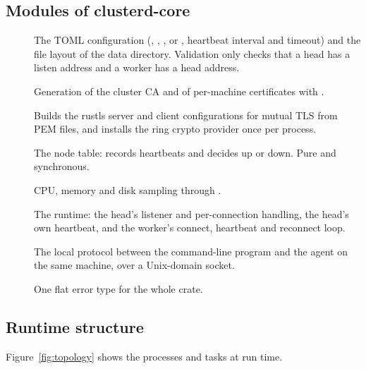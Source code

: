 \documentclass{article}
\begin{document}
\subsection{Modules of clusterd-core}

\begin{description}
  \item[] The TOML configuration (,
    , ,  or
    , heartbeat interval and timeout) and the file layout
    of the data directory. Validation only checks that a head has a
    listen address and a worker has a head address.
  \item[] Generation of the cluster CA and of per-machine
    certificates with .
  \item[] Builds the rustls server and client configurations
    for mutual TLS from PEM files, and installs the ring crypto provider
    once per process.
  \item[] The node table: records heartbeats and decides up or
    down. Pure and synchronous.
  \item[] CPU, memory and disk sampling through
    .
  \item[] The runtime: the head's listener and per-connection
    handling, the head's own heartbeat, and the worker's connect, heartbeat
    and reconnect loop.
  \item[] The local protocol between the command-line program
    and the agent on the same machine, over a Unix-domain socket.
  \item[] One flat error type for the whole crate.
\end{description}

\subsection{Runtime structure}

Figure~\ref{fig:topology} shows the processes and tasks at run time.
\end{document}
